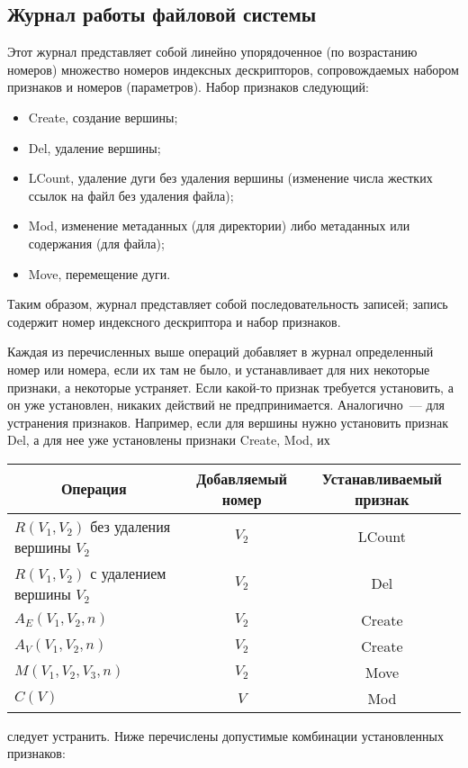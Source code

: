 \begin{multicols}{2}
\subsection{Журнал работы файловой системы}

      Этот журнал представляет собой линейно упорядоченное (по 
возрастанию номеров) множество номеров индексных дескрипторов, 
со\-про\-вож\-да\-емых набором признаков и номеров (параметров). Набор признаков 
следующий:
      \begin{itemize}
\item Create, создание вершины;
\item Del, удаление вершины;
\item LCount, удаление дуги без удаления вершины (изменение числа 
жестких ссылок на файл без удаления файла);
\item Mod, изменение метаданных (для директории) либо метаданных или 
содержания (для файла);
\item Move, перемещение дуги.
\end{itemize}

      Таким образом, журнал представляет собой последовательность 
записей; запись содержит номер индексного дескриптора и набор признаков.
      
      Каждая из перечисленных выше операций добавляет в журнал 
определенный номер или номера, если их там не было, и устанавливает для них 
некоторые признаки, а некоторые устраняет. Если какой-то признак требуется 
установить, а он уже установлен, никаких действий не предпринимается. 
Аналогично~--- для устранения признаков. Например, если для вершины нужно 
установить признак Del, а для нее уже установлены признаки Create, Mod, их 
      \begin{table*}\small
      \begin{center}
       \vspace*{2ex}
       
       \begin{tabular}{|l|c|c|}
       \hline
\multicolumn{1}{|c|}{Операция}&Добавляемый номер&Устанавливаемый 
признак \\
\hline
$R(V_1, V_2)$ без удаления вершины $V_2$&$V_2$&LCount\\
$R(V_1, V_2)$ с удалением вершины $V_2$&$V_2$&Del\\
$A_E(V_1, V_2, n)$&$V_2$&Create\\
$A_V(V_1, V_2, n)$&$V_2$&Create\\
$M(V_1, V_2, V_3, n)$&$V_2$&Move\\
$C(V)$&$V$&Mod\\
\hline
\end{tabular}
\end{center}
\end{table*}
следует устранить. Ниже перечислены допустимые комбинации установленных 
признаков:
\pagebreak


\end{multicols}
